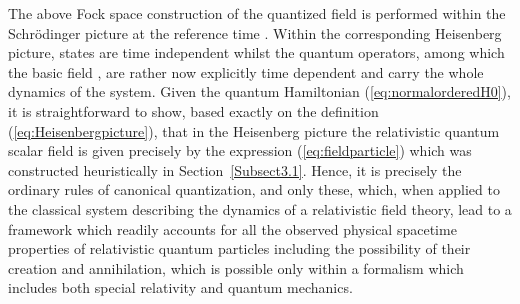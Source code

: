 \documentclass[a4paper,11pt]{article}
\begin{document}
The above Fock space construction of the quantized field is performed
within the Schr\"odinger picture at the reference time \coordHE{}. Within the
cor\-res\-pon\-ding Heisenberg picture, states are time independent
whilst the quantum operators, among which the basic field
\coordHE{}, are rather now explicitly time dependent and
carry the whole dynamics of the system. Given the quantum Hamiltonian
(\ref{eq:normalorderedH0}), it is straightforward to show, based exactly
on the definition (\ref{eq:Heisenbergpicture}), that in the Heisenberg
picture the relativistic quantum scalar field is given precisely
by the expression (\ref{eq:fieldparticle}) which was constructed
heuristically in Section~\ref{Subsect3.1}. Hence, it is precisely the ordinary
rules of canonical quantization, and only these, which, when applied to the
classical system describing the dynamics of a relativistic field theory,
lead to a framework which rea\-dily accounts for all the observed physical
spacetime properties of relativistic quantum particles including the
possibility of their creation and annihilation, which is possible
only within a formalism which includes both special relativity and
quantum mechanics.
\end{document}
